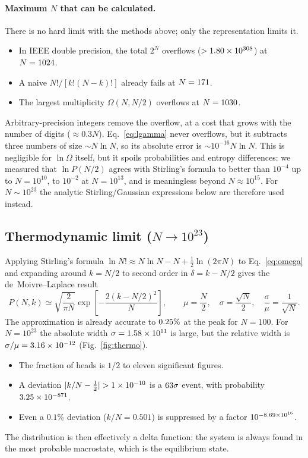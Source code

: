 \documentclass[11pt, a4paper]{article}
\begin{document}
\paragraph{Maximum $N$ that can be calculated.}
There is no hard limit with the methods above; only the representation limits it.
\begin{itemize}
\item In IEEE double precision, the total $2^N$ overflows ($>1.80\times10^{308}$) at $N=1024$.
\item A naive $N!/[k!(N-k)!]$ already fails at $N=171$.
\item The largest multiplicity $\Omega(N,N/2)$ overflows at $N=1030$.
\end{itemize}
Arbitrary-precision integers remove the overflow, at a cost that grows with the number of digits ($\approx0.3N$). Eq.~\eqref{eq:lgamma} never overflows, but it subtracts three numbers of size $\sim N\ln N$, so its absolute error is $\sim10^{-16}N\ln N$. This is negligible for $\ln\Omega$ itself, but it spoils probabilities and entropy differences: we measured that $\ln P(N/2)$ agrees with Stirling's formula to better than $10^{-4}$ up to $N=10^{10}$, to $10^{-2}$ at $N=10^{13}$, and is meaningless beyond $N\approx10^{15}$. For $N\sim10^{23}$ the analytic Stirling/Gaussian expressions below are therefore used instead.

\subsection{Thermodynamic limit ($N \rightarrow 10^{23}$)}
Applying Stirling's formula $\ln N!\approx N\ln N-N+\tfrac12\ln(2\pi N)$ to Eq.~\eqref{eq:omega} and expanding around $k=N/2$ to second order in $\delta=k-N/2$ gives the de~Moivre--Laplace result
\begin{equation}
P(N,k)\simeq\sqrt{\frac{2}{\pi N}}\exp\!\left[-\frac{2(k-N/2)^2}{N}\right],\qquad
\mu=\frac N2,\quad \sigma=\frac{\sqrt N}{2},\quad \frac{\sigma}{\mu}=\frac1{\sqrt N}.
\label{eq:gauss}
\end{equation}
The approximation is already accurate to $0.25\%$ at the peak for $N=100$. For $N=10^{23}$ the absolute width $\sigma=1.58\times10^{11}$ is large, but the relative width is $\sigma/\mu=3.16\times10^{-12}$ (Fig.~\ref{fig:thermo}).
\begin{itemize}
\item The fraction of heads is $1/2$ to eleven significant figures.
\item A deviation $|k/N-\tfrac12|>\TLeps$ is a $63\sigma$ event, with probability $3.25\times10^{-871}$.
\item Even a $0.1\%$ deviation ($k/N=0.501$) is suppressed by a factor $10^{-8.69\times10^{16}}$.
\end{itemize}
The distribution is then effectively a delta function: the system is always found in the most probable macrostate, which is the equilibrium state.
\end{document}
